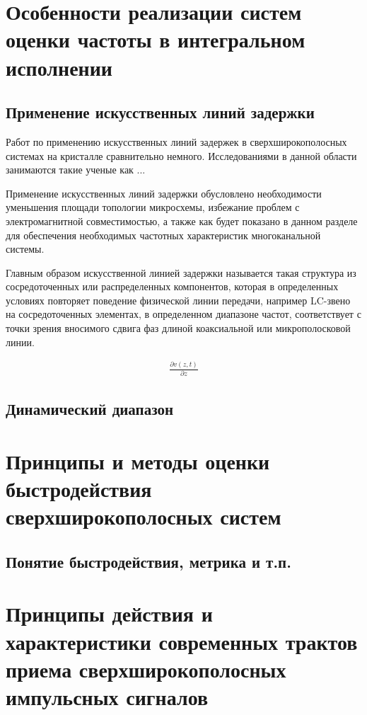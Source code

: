 \section{Особенности реализации систем оценки частоты в интегральном исполнении}

\subsection{Применение искусственных линий задержки}
Работ по применению искусственных линий задержек в сверхширокополосных системах на кристалле сравнительно немного. Исследованиями в данной области занимаются такие ученые как ...

Применение искусственных линий задержки обусловлено необходимости уменьшения площади топологии микросхемы, избежание проблем с электромагнитной совместимостью, а также как будет показано в данном разделе для обеспечения необходимых частотных характеристик многоканальной системы.

Главным образом искусственной линией задержки называется такая структура из сосредоточенных или распределенных компонентов, которая в определенных условиях повторяет поведение физической линии передачи, например LC-звено на сосредоточенных элементах, в определенном диапазоне частот, соответствует с точки зрения вносимого сдвига фаз длиной коаксиальной или микрополосковой линии.

\begin{equation*}
	\begin{aligned}
		\frac{\partial v(z,t)}{\partial z}
	\end{aligned}
\end{equation*}

\subsection{Динамический диапазон}


\section{Принципы и методы оценки быстродействия сверхширокополосных систем}

\subsection{Понятие быстродействия, метрика и т.п.}

\section{Принципы действия и характеристики современных трактов приема сверхширокополосных импульсных сигналов}

